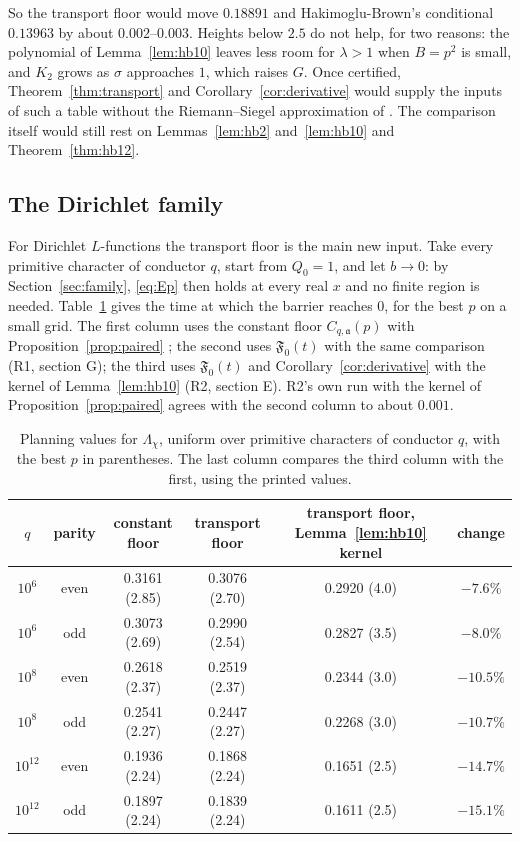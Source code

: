 \documentclass[11pt]{article}
\theoremstyle{definition}
\theoremstyle{remark}
\newcommand{\fa}{\mathfrak a}
\numberwithin{equation}{section}
\begin{document}
So the transport floor would move $0.18891$ and Hakimoglu-Brown's
conditional $0.13963$ by about $0.002$--$0.003$. Heights below $2.5$ do not
help, for two reasons: the polynomial of Lemma~\ref{lem:hb10} leaves less
room for $\lambda>1$ when $B=p^2$ is small, and $K_2$ grows as $\sigma$
approaches $1$, which raises $G$. Once certified,
Theorem~\ref{thm:transport} and Corollary~\ref{cor:derivative} would
supply the inputs of such a table without the Riemann--Siegel
approximation of \cite[Lemma~3]{hb}. The comparison itself would still
rest on Lemmas~\ref{lem:hb2} and~\ref{lem:hb10} and
Theorem~\ref{thm:hb12}.

\subsection{The Dirichlet family}

For Dirichlet $L$-functions the transport floor is the main new input. Take
every primitive character of conductor $q$, start from $Q_0=1$, and let
$b\to0$: by Section~\ref{sec:family}, \eqref{eq:Ep} then holds at every
real $x$ and no finite region is needed. Table~\ref{tab:familyplan} gives
the time at which the barrier reaches $0$, for the best $p$ on a small
grid. The first column uses the constant floor $C_{q,\fa}(p)$ with
Proposition~\ref{prop:paired} \cite[Section~4.6]{p01}; the second uses
$\mathfrak F_0(t)$ with the same comparison (R1, section G); the third uses
$\mathfrak F_0(t)$ and Corollary~\ref{cor:derivative} with the kernel of
Lemma~\ref{lem:hb10} (R2, section E). R2's own run with the kernel of
Proposition~\ref{prop:paired} agrees with the second column to about
$0.001$.

\begin{table}[ht]
\centering\small
\begin{tabular}{@{}cccccc@{}}
\toprule
$q$ & parity & constant floor & transport floor & transport floor, Lemma~\ref{lem:hb10} kernel & change\\
\midrule
$10^6$ & even & 0.3161 (2.85) & 0.3076 (2.70) & 0.2920 (4.0) & $-7.6\%$\\
$10^6$ & odd & 0.3073 (2.69) & 0.2990 (2.54) & 0.2827 (3.5) & $-8.0\%$\\
$10^8$ & even & 0.2618 (2.37) & 0.2519 (2.37) & 0.2344 (3.0) & $-10.5\%$\\
$10^8$ & odd & 0.2541 (2.27) & 0.2447 (2.27) & 0.2268 (3.0) & $-10.7\%$\\
$10^{12}$ & even & 0.1936 (2.24) & 0.1868 (2.24) & 0.1651 (2.5) & $-14.7\%$\\
$10^{12}$ & odd & 0.1897 (2.24) & 0.1839 (2.24) & 0.1611 (2.5) & $-15.1\%$\\
\bottomrule
\end{tabular}
\caption{Planning values for $\Lambda_\chi$, uniform over primitive characters of conductor $q$, with the best $p$ in parentheses. The last column compares the third column with the first, using the printed values.}\label{tab:familyplan}
\end{table}
\end{document}
